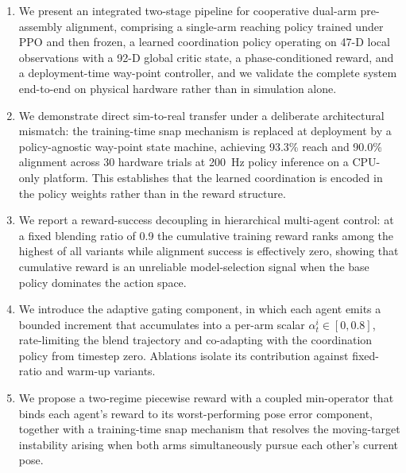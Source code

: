 \documentclass[a4paper,fleqn]{cas-dc}
\begin{document}
\begin{enumerate}
    \item We present an integrated two-stage pipeline for cooperative dual-arm pre-assembly alignment, comprising a single-arm reaching policy trained under PPO and then frozen, a learned coordination policy operating on 47-D local observations with a 92-D global critic state, a phase-conditioned reward, and a deployment-time way-point controller, and we validate the complete system end-to-end on physical hardware rather than in simulation alone.
    \item We demonstrate direct sim-to-real transfer under a deliberate architectural mismatch: the training-time snap mechanism is replaced at deployment by a policy-agnostic way-point state machine, achieving 93.3\% reach and 90.0\% alignment across 30 hardware trials at 200~Hz policy inference on a CPU-only platform. This establishes that the learned coordination is encoded in the policy weights rather than in the reward structure.
    \item We report a reward-success decoupling in hierarchical multi-agent control: at a fixed blending ratio of 0.9 the cumulative training reward ranks among the highest of all variants while alignment success is effectively zero, showing that cumulative reward is an unreliable model-selection signal when the base policy dominates the action space.
    \item We introduce the adaptive gating component, in which each agent emits a bounded increment that accumulates into a per-arm scalar $\alpha^i_t \in [0, 0.8]$, rate-limiting the blend trajectory and co-adapting with the coordination policy from timestep zero. Ablations isolate its contribution against fixed-ratio and warm-up variants.
    \item We propose a two-regime piecewise reward with a coupled min-operator that binds each agent's reward to its worst-performing pose error component, together with a training-time snap mechanism that resolves the moving-target instability arising when both arms simultaneously pursue each other's current pose.
\end{enumerate}
\end{document}
